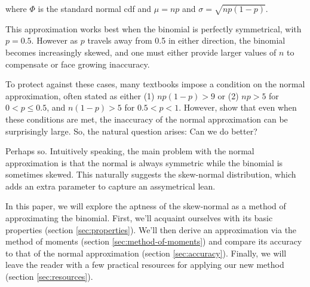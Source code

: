 where $\Phi$ is the standard normal cdf and $\mu = np$ and $\sigma =
\sqrt{np(1-p)}$.

This approximation works best when the binomial is perfectly symmetrical, with
$p=0.5$. However as $p$ travels away from 0.5 in either direction, the binomial
becomes increasingly skewed, and one must either provide larger values of $n$
to compensate or face growing inaccuracy.

To protect against these cases, many textbooks impose a condition on the normal
approximation, often stated as either (1) $np(1-p) > 9$ \; or \; (2) $np > 5$
for $0 < p \leq 0.5$, and $n(1-p) > 5$ for $0.5 < p < 1$. However, \citet{mabs}
show that even when these conditions are met, the inaccuracy of the normal
approximation can be surprisingly large. So, the natural question arises: Can
we do better?

Perhaps so. Intuitively speaking, the main problem with the normal
approximation is that the normal is always symmetric while the binomial is
sometimes skewed. This naturally suggests the skew-normal distribution, which
adds an extra parameter to capture an assymetrical lean.

In this paper, we will explore the aptness of the skew-normal as a method of
approximating the binomial. First, we'll acquaint ourselves with its basic
properties (section \ref{sec:properties}). We'll then derive an approximation
via the method of moments (section \ref{sec:method-of-moments}) and compare its
accuracy to that of the normal approximation (section \ref{sec:accuracy}).
Finally, we will leave the reader with a few practical resources for applying
our new method (section \ref{sec:resources}).
